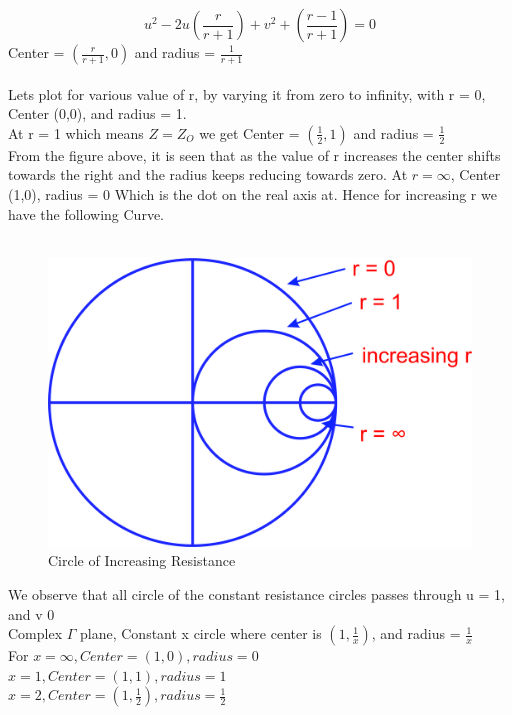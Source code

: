 \begin{equation*}
u^2 - 2u\left(\frac{r}{r + 1}\right) + v^2 +\left(\frac{r - 1}{r + 1}\right) = 0
\end{equation*}
Center = $(\frac{r}{r + 1},0)$ and radius = $\frac{1}{r + 1}$\\\\
Lets plot for various value of r, by varying it from zero to infinity, with r = 0, Center (0,0), and radius = 1.\\
At r = 1 which means $Z = Z_O$ we get  Center = $(\frac{1}{2},1)$ and radius = $\frac{1}{2}$\\
From the figure above, it is seen that as the value of r increases the center shifts towards the right and the radius keeps reducing towards zero. At $r = \infty$, Center (1,0), radius = 0 Which is the dot on the real axis at. Hence for increasing r we have the following Curve.\\\\
\begin{figure}[h]
\centering
\includegraphics[width=0.5\linewidth]{./graphics/rghmgfcx}
\caption{Circle of Increasing Resistance}
\label{fig:rghmgfcx}
\end{figure}
We observe that all circle of the constant resistance circles passes through u = 1, and v  0\\
Complex $\Gamma$ plane, Constant x circle where center is $(1,\frac{1}{x})$, and radius = $\frac{1}{x}$\\
For $x = \infty,Center = (1,0), radius = 0$\\
$x = 1,Center = (1,1), radius = 1$\\
$x = 2,Center = (1,\frac{1}{2}), radius = \frac{1}{2}$\\
